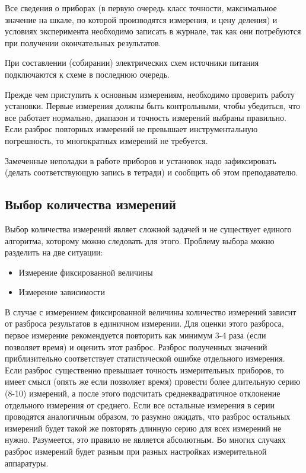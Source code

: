Все сведения о приборах (в первую очередь класс точности, максимальное
значение на шкале, по которой производятся измерения, и цену деления)
и условиях эксперимента необходимо записать в журнале, так
как они потребуются при получении окончательных результатов.

При составлении (собирании) электрических схем источники питания подключаются
к схеме в последнюю очередь.

Прежде чем приступить к основным измерениям, необходимо проверить
работу установки. Первые измерения должны быть контрольными, чтобы
убедиться, что все работает нормально, диапазон и точность измерений
выбраны правильно. Если разброс повторных измерений не превышает инструментальную
погрешность, то многократных измерений не требуется.

Замеченные неполадки в работе приборов и установок надо зафиксировать
(делать соответствующую запись в тетради) и сообщить об этом преподавателю.%


\subsection{Выбор количества измерений}

Выбор количества измерений являет сложной задачей и не существует единого алгоритма, которому можно следовать для этого. Проблему выбора можно разделить на две ситуации:
\begin{itemize}
    \item Измерение фиксированной величины
    \item Измерение зависимости
\end{itemize}

В случае с измерением фиксированной величины количество измерений зависит от разброса результатов в единичном измерении. Для оценки этого разброса, первое измерение рекомендуется повторить как минимум 3-4 раза (если позволяет время) и оценить этот разброс. Разброс полученных значений приблизительно соответствует статистической ошибке отдельного измерения. Если разброс существенно превышает точность измерительных приборов, то имеет смысл (опять же если позволяет время) провести более длительную серию (8-10) измерений, а после этого подсчитать среднеквадратичное отклонение отдельного измерения от среднего. Если все остальные измерения в серии проводятся аналогичным образом, то разумно ожидать, что разброс остальных измерений будет такой же повторять длинную серию для всех измерений не нужно. Разумеется, это правило не является абсолютным. Во многих случаях разброс измерений будет разным при разных настройках измерительной аппаратуры.

